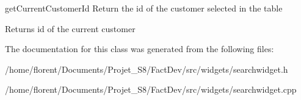 get\-Current\-Customer\-Id Return the id of the customer selected in the table 

\begin{DoxyReturn}{Returns}
id of the current customer 
\end{DoxyReturn}


The documentation for this class was generated from the following files\-:\begin{DoxyCompactItemize}
\item 
/home/florent/\-Documents/\-Projet\-\_\-\-S8/\-Fact\-Dev/src/widgets/searchwidget.\-h\item 
/home/florent/\-Documents/\-Projet\-\_\-\-S8/\-Fact\-Dev/src/widgets/searchwidget.\-cpp\end{DoxyCompactItemize}
